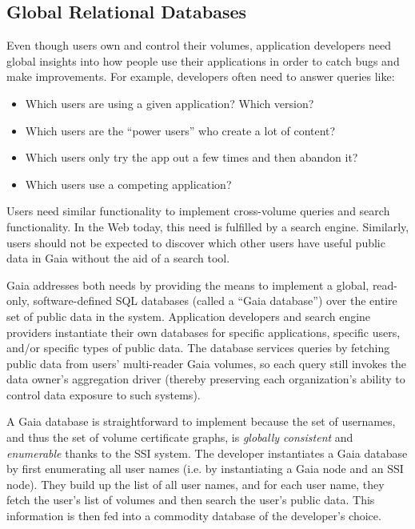 \subsection{Global Relational Databases}

Even though users own and control their volumes, 
application developers need global insights into how people use their
applications in order to catch bugs and make improvements. 
For example, developers often need to answer queries like:

\begin{itemize}
   \item Which users are using a given application?  Which version?
   \item Which users are the ``power users'' who create a lot of content?
   \item Which users only try the app out a few times and then abandon it?
   \item Which users use a competing application?
\end{itemize}

Users need similar functionality to implement cross-volume queries and search
functionality.  In the Web today, this need is fulfilled by a search engine.
Similarly, users should not be expected to discover which other users have
useful public data in Gaia without the aid of a search tool.

Gaia addresses both needs by providing the means to 
implement a global, read-only, software-defined SQL databases (called a ``Gaia
database'') over the entire set of public data in the system.  Application developers and search
engine providers instantiate their own databases for specific
applications, specific users, and/or specific
types of public data.  The database services queries by fetching
public data from users' multi-reader Gaia volumes, so each query still 
invokes the data owner's aggregation driver (thereby preserving each
organization's ability to control data exposure to such systems).

A Gaia database is straightforward to
implement because the set of usernames, and thus the set of volume certificate
graphs, is \emph{globally consistent} and \emph{enumerable} thanks to the SSI
system.  The developer instantiates a Gaia database by first
enumerating all user names (i.e. by instantiating a Gaia node and
an SSI node).  They build up the list of all user names, and for each user name,
they fetch the user's list of volumes and then search the user's public data.
This information is then fed into a commodity database of the developer's
choice.

